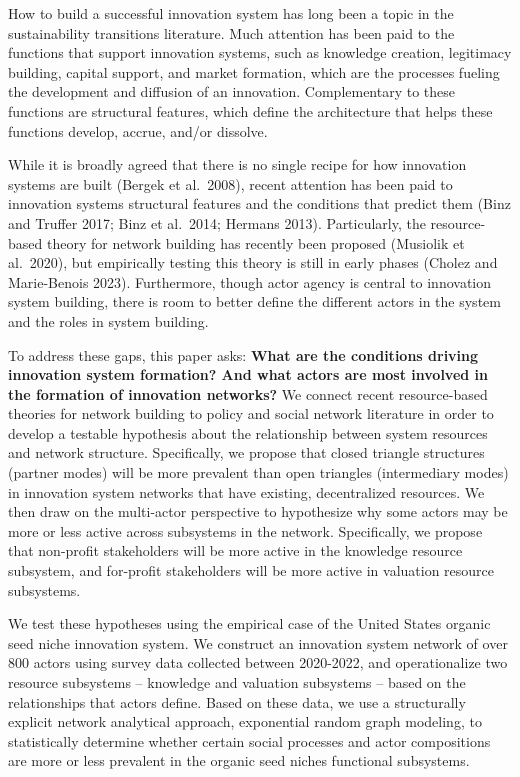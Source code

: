 \documentclass[twoside,12pt,final]{ucthesis-CA2012}
\begin{document}
\begin{ucmainmatter}
How to build a successful innovation system has long been a topic in the
sustainability transitions literature. Much attention has been paid to
the functions that support innovation systems, such as knowledge
creation, legitimacy building, capital support, and market formation,
which are the processes fueling the development and diffusion of an
innovation. Complementary to these functions are structural features,
which define the architecture that helps these functions develop,
accrue, and/or dissolve.

While it is broadly agreed that there is no single recipe for how
innovation systems are built (Bergek et al.~2008), recent attention has
been paid to innovation systems\textquotesingle{} structural features and the conditions
that predict them (Binz and Truffer 2017; Binz et al.~2014; Hermans
2013). Particularly, the resource-based theory for network building has
recently been proposed (Musiolik et al.~2020), but empirically testing
this theory is still in early phases (Cholez and Marie-Benois 2023).
Furthermore, though actor agency is central to innovation system
building, there is room to better define the different actors in the
system and the roles in system building.

To address these gaps, this paper asks: \textbf{What are the conditions
driving innovation system formation? And what actors are most involved
in the formation of innovation networks?} We connect recent
resource-based theories for network building to policy and social
network literature in order to develop a testable hypothesis about the
relationship between system resources and network structure.
Specifically, we propose that closed triangle structures (\textquotesingle partner
modes\textquotesingle) will be more prevalent than open triangles (\textquotesingle intermediary
modes\textquotesingle) in innovation system networks that have existing, decentralized
resources. We then draw on the multi-actor perspective to hypothesize
why some actors may be more or less active across subsystems in the
network. Specifically, we propose that non-profit stakeholders will be
more active in the knowledge resource subsystem, and for-profit
stakeholders will be more active in valuation resource subsystems.

We test these hypotheses using the empirical case of the United States
organic seed niche innovation system. We construct an innovation system
network of over 800 actors using survey data collected between
2020-2022, and operationalize two resource subsystems -- knowledge and
valuation subsystems -- based on the relationships that actors define.
Based on these data, we use a structurally explicit network analytical
approach, exponential random graph modeling, to statistically determine
whether certain social processes and actor compositions are more or less
prevalent in the organic seed niche\textquotesingle s functional subsystems.


\end{ucmainmatter}
\end{document}

